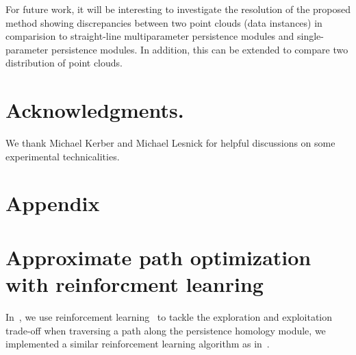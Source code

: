 \documentclass[sigconf, nonacm, natbib=false]{acmart} %
\let\svtodo\todo
\renewcommand\todo[1]{\svtodo[inline]{#1}}
\newcommand{\RC}[1]{\todo{RC:~#1}}
\theoremstyle{plain}
\begin{document}
For future work, it will be interesting to investigate the resolution of the proposed method showing discrepancies between two point clouds (data instances) in comparision to straight-line multiparameter persistence modules and single-parameter persistence modules. In addition, this can be extended to compare two distribution of point clouds.


%
%


\section*{Acknowledgments.} 
We thank Michael Kerber and Michael Lesnick for helpful discussions on some experimental technicalities.

\printbibliography

\section*{Appendix}
\appendix
\section{Approximate path optimization with reinforcment leanring}\label{sec:rl}
In~, we use reinforcement learning~\cite{sutton1999reinforcement,sun2020reinbo} to tackle the exploration and exploitation trade-off when traversing a path along the persistence homology module, we implemented a similar reinforcement learning algorithm as in~\cite{sun2020reinbo}.
\end{document}
